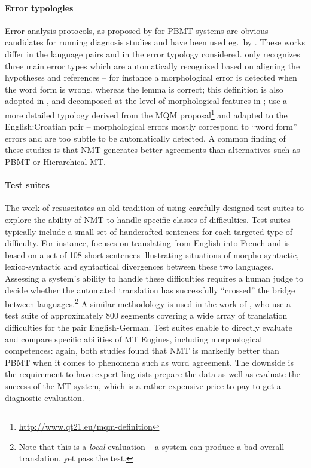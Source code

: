 \documentclass[11pt,letterpaper,final,nohyperref]{article}
\begin{document}
\paragraph{Error typologies}
Error analysis protocols, as proposed by \citet{Vilar06error,Popovic11towards,Stymne11blast} for PBMT systems are obvious candidates for running diagnosis studies and have been used eg.\ by \citet{Bentivogli16neural,Toral17multifacet,Costajussa17whycatalan,Kublicka17finegrained}. These works differ in the language pairs and in the error typology considered. \citet{Bentivogli16neural} only recognizes three main error types which are automatically recognized based on aligning the hypotheses and references -- for instance a morphological error is detected when the word form is wrong, whereas the lemma is correct; this definition is also adopted in \citep{Toral17multifacet}, and decomposed at the level of morphological features in \citep{Peter16qt21}; \citep{Kublicka17finegrained} use a more detailed typology derived from the MQM proposal\footnote{\url{http://www.qt21.eu/mqm-definition}} and adapted to the English:Croatian pair -- morphological errors mostly correspond to ``word form'' errors and are too subtle to be automatically detected. 
A common finding of these studies is that NMT generates better agreements than alternatives such as PBMT or Hierarchical MT.

\paragraph{Test suites}
The work of \citet{Isabelle17challenge,Burchardt17linguistic} resuscitates an old tradition of using carefully designed test suites \citet{King90using,Lehmann96tsnlp} to explore the ability of NMT to handle specific classes of difficulties. Test suites typically include a small set of  handcrafted sentences for each targeted type of difficulty. For instance,  \citet{Isabelle17challenge} focuses on translating from English into French and is based on a set of 108 short sentences illustrating situations of morpho-syntactic, lexico-syntactic and syntactical divergences between these two languages. Assessing a system's ability to handle these difficulties requires a human judge to decide whether the automated translation has successfully ``crossed'' the bridge between languages.\footnote{Note that this is a \emph{local} evaluation -- a system can produce a bad overall translation, yet pass the test.}
A similar methodology is used in the work of \citet{Burchardt17linguistic}, who use a test suite of approximately 800 segments covering a wide array of translation difficulties for the pair English-German. Test suites enable to directly evaluate and compare specific
abilities of MT Engines, including morphological competences: again,  both studies found that NMT is markedly better than PBMT when it comes to phenomena such as word agreement. The downside is the requirement to have expert linguists prepare the data as well as evaluate the success of the MT system, which is a rather expensive price to pay to get a diagnostic evaluation. 
\end{document}
